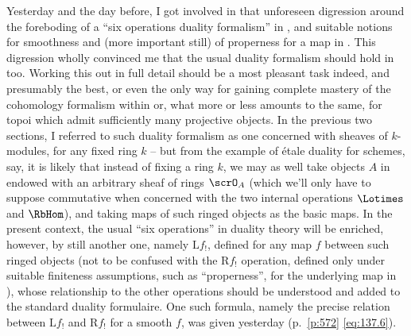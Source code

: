 \bigbreak

\presectionfill{}\par

\label{sec:138}%
Yesterday and the day before, I got involved in that unforeseen
digression around the foreboding of a ``six operations duality
formalism'' in \Cat, and suitable notions for smoothness and (more
important still) of properness for a map in \Cat. This digression
wholly convinced me that the usual duality formalism should hold in
\Cat{} too. Working this out in full detail should be a most pleasant
task indeed, and presumably the best, or even the only way for gaining
complete mastery of the cohomology formalism within \Cat{} or, what
more or less amounts to the same, for topoi which admit sufficiently
many projective objects. In the previous two sections, I referred to
such duality formalism as one concerned with sheaves of $k$-modules,
for any fixed ring $k$ -- but from the example of étale duality for
schemes, say, it is likely that instead of fixing a ring $k$, we may
as well take objects $A$ in \Cat{} endowed with an arbitrary sheaf of
rings $\scrO_A$ (which we'll only have to suppose commutative when
concerned with the two internal operations $\Lotimes$ and $\RbHom$),
and taking maps of such ringed objects as the basic maps. In the
present context, the usual ``six operations'' in duality theory will
be enriched, however, by still another one, namely $\mathrm Lf_!$,
defined for any map $f$ between such ringed objects (not to be
confused with the $\mathrm Rf_!$ operation, defined only under
suitable finiteness assumptions, such as ``properness'', for the
underlying map in \Cat), whose relationship to the other operations
should be understood and added to the standard duality
formulaire. One such formula, namely the precise relation
between $\mathrm Lf_!$ and $\mathrm Rf_!$ for a smooth $f$, was given
yesterday (p.~\ref{p:572} \eqref{eq:137.6}).

